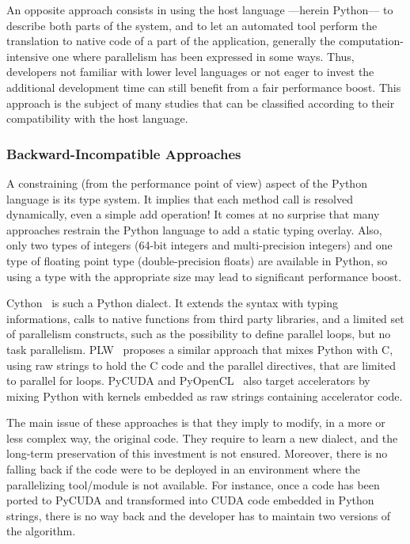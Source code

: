 \documentclass{llncs}
\begin{document}
An opposite approach consists in using the host language ---herein Python--- to
describe both parts of the system, and to let an automated tool perform the
translation to native code of a part of the application, generally the
computation-intensive one where parallelism has been expressed in some ways.
Thus, developers not familiar with lower level languages or not eager to invest
the additional development time can still benefit from a fair performance boost.
This approach is the subject of many studies that can be classified according to
their compatibility with the host language.

\subsubsection{Backward-Incompatible Approaches}


A constraining (from the performance point of view) aspect of the Python
language is its type system. It implies that each method call is resolved
dynamically, even a simple add operation! It comes at no surprise that many
approaches restrain the Python language to add a static typing overlay.  Also,
only two types of integers (64-bit integers and multi-precision integers) and
one type of floating point type (double-precision floats) are available in
Python, so using a type with the appropriate size may lead to significant
performance boost.

Cython~\cite{cython2010} is such a Python dialect. It extends the syntax with
typing informations, calls to native functions from third party libraries, and a
limited set of parallelism constructs, such as the possibility to define
parallel loops, but no task parallelism. PLW~\cite{dongara2007} proposes a
similar approach that mixes Python with C, using raw strings to hold the C code
and the parallel directives, that are limited to parallel for loops.
PyCUDA and PyOpenCL~\cite{klockner2012} also target accelerators by mixing
Python with kernels embedded as raw strings containing accelerator code.

The main issue of these approaches is that they imply to modify, in a more or
less complex way, the original code. They require to learn a new dialect,
and the long-term preservation of this investment is not ensured. Moreover,
there is no falling back if the code were to be deployed in an environment
where the parallelizing tool/module is not available. For instance, once a code
has been ported to PyCUDA and transformed into CUDA code embedded in Python
strings, there is no way back and the developer has to maintain two versions of
the algorithm.
\end{document}
